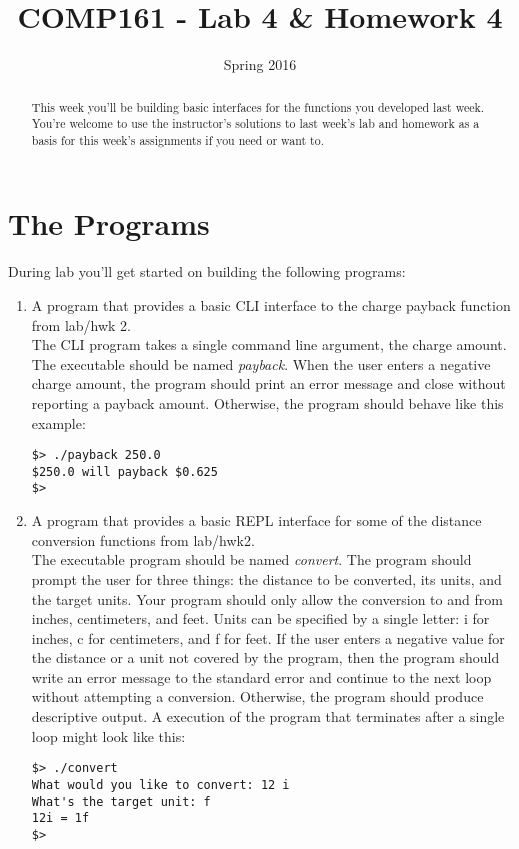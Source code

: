 \documentclass[]{tufte-handout}
\title{COMP161 - Lab 4 \& Homework 4}
\author{}
\date{Spring 2016}
\begin{document}
\maketitle
\thispagestyle{empty}

\begin{abstract}
This week you'll be building basic interfaces for the functions you developed last week. You're welcome to use the instructor's solutions to last week's lab and homework as a basis for this week's assignments if you need or want to. 
\end{abstract}

\section{The Programs}

During lab you'll get started on building the following programs:
\begin{enumerate}
\item A program that provides a basic CLI interface to the charge payback function from lab/hwk 2. \\
The CLI program takes a single command line argument, the charge amount. The executable should be named \textit{payback}. When the user enters a negative charge amount, the program should print an error message and close without reporting a payback amount. Otherwise, the program should behave like this example: 
\begin{verbatim}
$> ./payback 250.0
$250.0 will payback $0.625
$>
\end{verbatim}


\item A program that provides a basic REPL interface for some of the distance conversion functions from lab/hwk2. \\
The executable program should be named \textit{convert}. The program should prompt the user for three things: the distance to be converted, its units, and the target units. Your program should only allow the conversion to and from inches, centimeters, and feet. Units can be specified by a single letter: i for inches, c for centimeters, and f for feet. If the user enters a negative value for the distance or a unit not covered by the program, then the program should write an error message to the standard error and continue to the next loop without attempting a conversion. Otherwise, the program should produce descriptive output. A execution of the program that terminates after a single loop might look like this:
\begin{verbatim}
$> ./convert
What would you like to convert: 12 i
What's the target unit: f
12i = 1f
$>
\end{verbatim}
\end{enumerate}
\end{document}

